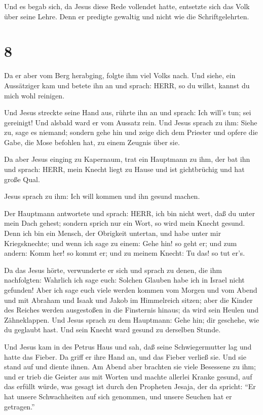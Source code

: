  Und es begab sich, da Jesus diese Rede vollendet hatte,
entsetzte sich das Volk über seine Lehre.  Denn er predigte
gewaltig und nicht wie die Schriftgelehrten.

\hypertarget{section-7}{%
\section{8}\label{section-7}}

 Da er aber vom Berg herabging, folgte ihm viel Volks nach.
 Und siehe, ein Aussätziger kam und betete ihn an und
sprach: HERR, so du willst, kannst du mich wohl reinigen.

 Und Jesus streckte seine Hand aus, rührte ihn an und
sprach: Ich will's tun; sei gereinigt! Und alsbald ward er vom Aussatz
rein.  Und Jesus sprach zu ihm: Siehe zu, sage es niemand;
sondern gehe hin und zeige dich dem Priester und opfere die Gabe, die
Mose befohlen hat, zu einem Zeugnis über sie.

 Da aber Jesus einging zu Kapernaum, trat ein Hauptmann zu
ihm, der bat ihn  und sprach: HERR, mein Knecht liegt zu
Hause und ist gichtbrüchig und hat große Qual.

 Jesus sprach zu ihm: Ich will kommen und ihn gesund machen.

 Der Hauptmann antwortete und sprach: HERR, ich bin nicht
wert, daß du unter mein Dach gehest; sondern sprich nur ein Wort, so
wird mein Knecht gesund.  Denn ich bin ein Mensch, der
Obrigkeit untertan, und habe unter mir Kriegsknechte; und wenn ich sage
zu einem: Gehe hin! so geht er; und zum andern: Komm her! so kommt er;
und zu meinem Knecht: Tu das! so tut er's.

 Da das Jesus hörte, verwunderte er sich und sprach zu
denen, die ihm nachfolgten: Wahrlich ich sage euch: Solchen Glauben habe
ich in Israel nicht gefunden!  Aber ich sage euch viele
werden kommen vom Morgen und vom Abend und mit Abraham und Isaak und
Jakob im Himmelreich sitzen;  aber die Kinder des Reiches
werden ausgestoßen in die Finsternis hinaus; da wird sein Heulen und
Zähneklappen.  Und Jesus sprach zu dem Hauptmann: Gehe hin;
dir geschehe, wie du geglaubt hast. Und sein Knecht ward gesund zu
derselben Stunde.

 Und Jesus kam in des Petrus Haus und sah, daß seine
Schwiegermutter lag und hatte das Fieber.  Da griff er ihre
Hand an, und das Fieber verließ sie. Und sie stand auf und diente ihnen.
 Am Abend aber brachten sie viele Besessene zu ihm; und er
trieb die Geister aus mit Worten und machte allerlei Kranke gesund,
 auf das erfüllt würde, was gesagt ist durch den Propheten
Jesaja, der da spricht: ``Er hat unsere Schwachheiten auf sich genommen,
und unsere Seuchen hat er getragen.''

